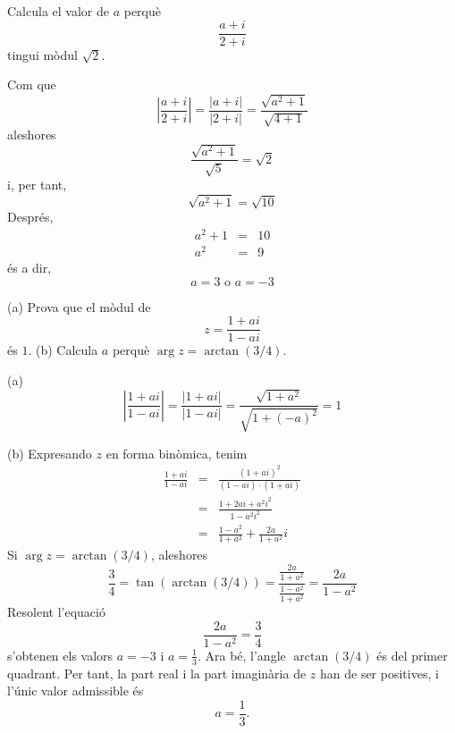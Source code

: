 \begin{exemple}
Calcula el valor de $a$ perquè
\begin{equation*}
\frac{a+i}{2+i}
\end{equation*}
tingui mòdul $\sqrt{2}$.
\end{exemple}

\begin{solucio}
Com que
\begin{equation*}
\left\vert \frac{a+i}{2+i}\right\vert =\frac{\left\vert a+i\right\vert }{
\left\vert 2+i\right\vert }=\frac{\sqrt{a^{2}+1}}{\sqrt{4+1}}
\end{equation*}
aleshores
\begin{equation*}
\frac{\sqrt{a^{2}+1}}{\sqrt{5}}=\sqrt{2}
\end{equation*}
i, per tant,
\begin{equation*}
\sqrt{a^{2}+1}=\sqrt{10}
\end{equation*}
Després,
\begin{eqnarray*}
a^{2}+1 &=&10 \\
a^{2} &=&9
\end{eqnarray*}
és a dir,
\begin{equation*}
a=3\text{ \ \ \ o \ \ \ }a=-3
\end{equation*}
\end{solucio}

\begin{exemple}
(a) Prova que el mòdul de
\begin{equation*}
z=\frac{1+ai}{1-ai}
\end{equation*}
és $1$. (b) Calcula $a$ perquè $\arg z=\arctan (3/4)$.
\end{exemple}

\begin{solucio}
(a)
\begin{equation*}
\left\vert \frac{1+ai}{1-ai}\right\vert =\frac{\left\vert 1+ai\right\vert }{
\left\vert 1-ai\right\vert }=\frac{\sqrt{1+a^{2}}}{\sqrt{1+(-a)^{2}}}=1
\end{equation*}

(b) Expresando $z$ en forma binòmica, tenim
\begin{eqnarray*}
\frac{1+ai}{1-ai} &=&\frac{(1+ai)^{2}}{(1-ai)\cdot (1+ai)} \\
&=&\frac{1+2ai+a^{2}i^{2}}{1-a^{2}i^{2}} \\
&=&\frac{1-a^{2}}{1+a^{2}}+\frac{2a}{1+a^{2}}i
\end{eqnarray*}
Si $\arg z=\arctan (3/4)$, aleshores
\begin{equation*}
\frac{3}{4}=\tan (\arctan (3/4))=\frac{\frac{2a}{1+a^{2}}}{\frac{1-a^{2}}{
1+a^{2}}}=\frac{2a}{1-a^{2}}
\end{equation*}
Resolent l’equació
\begin{equation*}
\frac{2a}{1-a^{2}}=\frac{3}{4}
\end{equation*}
s’obtenen els valors $a=-3$ i $a=\frac{1}{3}$. Ara bé, l’angle $\arctan(3/4)$ és del primer quadrant. Per tant, la part real i la part imaginària de $z$ han de ser positives, i l’únic valor admissible és
\begin{equation*}
a=\frac{1}{3}.
\end{equation*}
\end{solucio}

